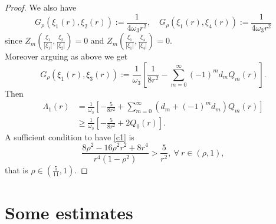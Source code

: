 \documentclass[11pt,a4paper]{amsart}
\theoremstyle{definition}
\renewcommand{\(}{\left(}
\renewcommand{\)}{\right)}
\begin{document}
\begin{proof}
We also have
$$G_\rho(\xi_1(r), \xi_2(r)):=\frac{1}{4\omega_3 r^2},\quad G_\rho(\xi_1(r), \xi_4(r)):=\frac{1}{4\omega_3 r^2}$$
since $Z_m\left(\frac{\xi_1}{|\xi_1|},\frac{\xi_2}{|\xi_2|}\right)=0$ and $Z_m\left(\frac{\xi_1}{|\xi_1|},\frac{\xi_4}{|\xi_4|}\right)=0$.\\
Moreover arguing as above we get
$$G_\rho(\xi_1(r), \xi_3(r)):=\frac{1}{\omega_3}\left[\frac{1}{8r^2}-\sum_{m=0}^\infty (-1)^m d_m Q_m(r)\right].$$ 
Then
\begin{equation*}
\begin{aligned}
\Lambda_1(r) & = \frac{1}{\omega_3} \left[ -\frac{5}{8r^{2}} + \sum_{m=0}^{\infty} (d_m+ (-1)^{m} d_m) Q_{m}(r) \right]
\\& \geq \frac{1}{\omega_3} \left[ - \frac{5}{8r^{2}} + 2Q_{0}(r) \right].\end{aligned}
\end{equation*}
A sufficient condition to have \eqref{c1} is 
\begin{equation*}
\frac{8\rho^2 -16\rho^2r^2+8r^4}{r^{4}(1-\rho^2)} > \frac{5}{r^2}, \ \forall\ r \in (\rho,1),
\end{equation*}
that is $\rho \in (\frac{5}{11}, 1)$.
\end{proof}
\appendix
\section{Some estimates} \label{app}
\end{document}
